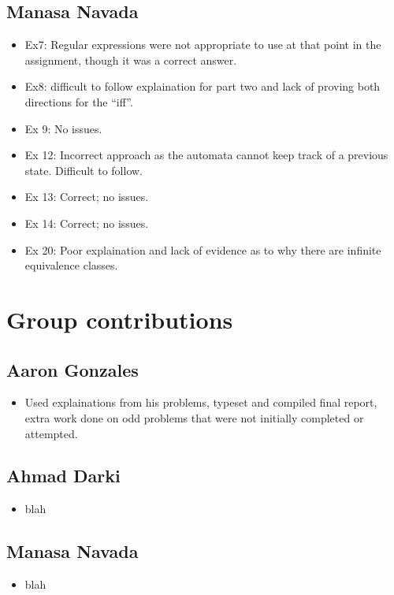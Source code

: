 \documentclass[titlepage]{article}\usepackage[]{graphicx}\usepackage[]{color}
\begin{document}
\subsection{Manasa Navada}
\begin{itemize}
	\item Ex7: Regular expressions were not appropriate to use at that
		point in the assignment, though it was a correct answer. 

	\item Ex8: difficult to follow explaination for part two and lack of
		proving both directions for the ``iff''. 

	\item Ex 9: No issues.

	\item Ex 12: Incorrect approach as the automata cannot keep track of a
		previous state. Difficult to follow.

	\item Ex 13: Correct; no issues.

	\item Ex 14: Correct; no issues.

	\item Ex 20: Poor explaination and lack of evidence as to why there are
		infinite equivalence classes.
\end{itemize}


\section*{Group contributions}
\subsection{Aaron Gonzales}
\begin{itemize}
	\item Used explainations from his problems, typeset and compiled final
		report, extra work done on odd problems that were not initially
		completed or attempted. 
\end{itemize}
\subsection{Ahmad Darki}
\begin{itemize}
	\item blah
\end{itemize}
\subsection{Manasa Navada}
\begin{itemize}
	\item blah
\end{itemize}
\end{document}
